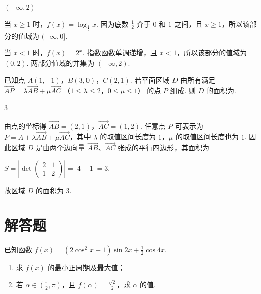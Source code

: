 \begin{answer}
\((-\infty,2)\)
\end{answer}

\begin{solution}
当 \(x\geqslant1\) 时，\(f(x)=\log_{\frac{1}{2}}x\). 因为底数 \(\frac{1}{2}\) 介于 \(0\) 和 \(1\) 之间，且 \(x\geqslant1\)，所以该部分的值域为 \((-\infty,0]\).

当 \(x<1\) 时，\(f(x)=2^x\). 指数函数单调递增，且 \(x<1\)，所以该部分的值域为 \((0,2)\). 两部分值域的并集为 \((-\infty,2)\).
\end{solution}

\begin{problem}
已知点 \(A(1, -1)\)，\(B(3, 0)\)，\(C(2, 1)\). 若平面区域 \(D\) 由所有满足 \(\overrightarrow{AP} = \lambda \overrightarrow{AB} + \mu \overrightarrow{AC}\) （\(1 \leqslant \lambda \leqslant 2\)，\(0 \leqslant \mu \leqslant 1\)） 的点 \(P\) 组成. 则 \(D\) 的面积为\fillinblank{}.
\end{problem}

\begin{answer}
\(3\)
\end{answer}

\begin{solution}
由点的坐标得 \(\overrightarrow{AB}=(2,1)\)，\(\overrightarrow{AC}=(1,2)\). 任意点 \(P\) 可表示为 \(P=A+\lambda\overrightarrow{AB}+\mu\overrightarrow{AC}\)，其中 \(\lambda\) 的取值区间长度为 \(1\)，\(\mu\) 的取值区间长度也为 \(1\). 因此区域 \(D\) 是由两个边向量 \(\overrightarrow{AB}\)、\(\overrightarrow{AC}\) 张成的平行四边形，其面积为

\(S=\left|\det\begin{pmatrix}2&1\\1&2\end{pmatrix}\right|=|4-1|=3\).

故区域 \(D\) 的面积为 \(3\).
\end{solution}

\section{解答题}

\begin{problem}
已知函数 \( f(x) = (2\cos^2 x - 1)\sin 2x + \frac{1}{2}\cos 4x \).
\begin{enumerate}
\item 求 \( f(x) \) 的最小正周期及最大值；
\item 若 \(\alpha \in \left(\frac{\pi}{2}, \pi\right)\)，且 \(f(\alpha) = \frac{\sqrt{2}}{2}\)，求 \(\alpha\) 的值.
\end{enumerate}
\end{problem}

